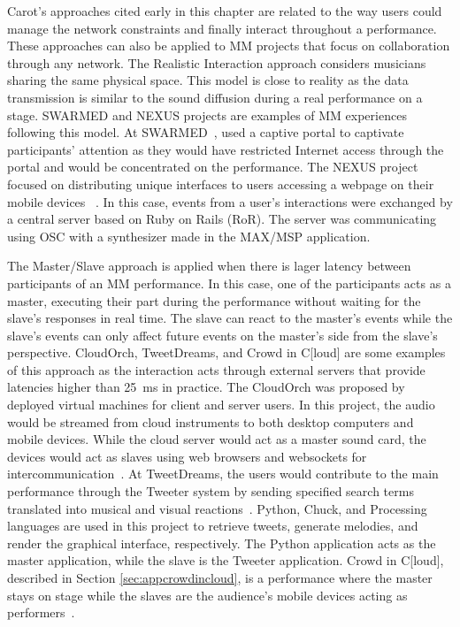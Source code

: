 
Carot's approaches cited early in this chapter are related to the way users could manage the network constraints and finally interact throughout a performance.
These approaches can also be applied to MM projects that focus on collaboration through any network.
The Realistic Interaction approach considers musicians sharing the same physical space.
This model is close to reality as the data transmission is similar to the sound diffusion during a real performance on a stage.
SWARMED and NEXUS projects are examples of MM experiences following this model.
At SWARMED~\citep{Hindle2013swarmed},  used a captive portal to captivate participants' attention as they would have restricted Internet access through the portal and would be concentrated on the performance.
The NEXUS project focused on distributing unique interfaces to users accessing a webpage on their mobile devices~
\citep{Allison2013nexus}.
In this case, events from a user's interactions were exchanged by a central server based on Ruby on Rails (RoR).
The server was communicating using OSC with a synthesizer made in the MAX/MSP application.

The Master/Slave approach is applied when there is lager latency between participants of an MM performance.
In this case, one of the participants acts as a master, executing their part during the performance without waiting for the slave's responses in real time.
The slave can react to the master's events while the slave's events can only affect future events on the master's side from the slave's perspective.
CloudOrch, TweetDreams, and Crowd in C[loud] are some examples of this approach as the interaction acts through external servers that provide latencies higher than 25~ms in practice.
The CloudOrch was proposed by  deployed virtual machines for client and server users.
In this project, the audio would be streamed from cloud instruments to both desktop computers and mobile devices.
While the cloud server would act as a master sound card, the devices would act as slaves using web browsers and websockets for intercommunication~\citep{Hindle2014cloudorch}.
At TweetDreams, the users would contribute to the main performance through the Tweeter system by sending specified search terms translated into musical and visual reactions~\citep{Dahl2011tweetdreams}.
Python, Chuck, and Processing languages are used in this project to retrieve tweets, generate melodies, and render the graphical interface, respectively.
The Python application acts as the master application, while the slave is the Tweeter application.
Crowd in C[loud], described in Section \ref{sec:appcrowdincloud}, is a performance where the master stays on stage while the slaves are the audience's mobile devices acting as performers~\citep{Lee2016crowd,deCarvalhoJunior2016understanding}.

